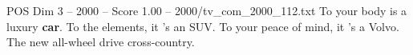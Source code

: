 \begin{textsample}{POS Dim 3 – 2000 – Score 1.00 – 2000/tv\_com\_2000\_112.txt}  \label{ex:f3_pos_083}
To your body is a luxury \textbf{car}.
To the elements, it 's an SUV.
To your peace of mind, it 's a Volvo.
The new all-wheel drive cross-country.

\end{textsample}
